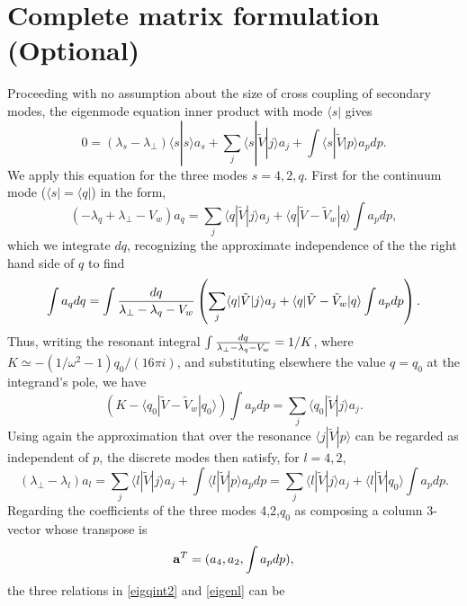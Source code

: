 \documentclass[12pt]{article}
\def\ket#1{|#1\rangle}
\def\bra#1{\langle#1}
\def\a{{\bf a}}
\begin{document}
\section{Complete matrix formulation (Optional)}

Proceeding with no assumption about the size of cross coupling of secondary
modes, the eigenmode equation inner product with mode $\bra{s}|$ gives
\begin{equation}
  \label{eigengen}
  0=(\lambda_s-\lambda_\perp)\bra{s}\ket{s}a_s+\sum_j\bra{s}|\tilde{V}\ket{j}a_j
+\int\bra{s}|\tilde{V}\ket{p}a_pdp.
\end{equation}
We apply this equation for the three modes $s=4,2,q$. First for the
continuum mode ($\bra{s}|=\bra{q}|$) in the form,
\begin{equation}
  \label{eigq}
  (-\lambda_q+\lambda_\perp-V_w)a_q=\sum_j\bra{q}|\tilde{V}\ket{j}a_j
+\bra{q}|\tilde V-\tilde V_w\ket{q}\int a_pdp,
\end{equation}
which we integrate $dq$, recognizing the approximate independence of
the the right hand side of $q$ to find
\begin{equation}
  \label{eigqint}
  \int a_q dq =\int {dq\over \lambda_\perp-\lambda_q-V_w}
  \left(\sum_j\bra{q}|\tilde{V}\ket{j}a_j
+\bra{q}|\tilde V-\tilde V_w\ket{q}\int a_pdp \right).
\end{equation}
Thus, writing the resonant integral
$\int {dq\over \lambda_\perp-\lambda_q-V_w}=1/K$, where
$K\simeq-(1/\omega^2-1)q_0/(16\pi i) $, and substituting elsewhere the
value $q=q_0$ at the integrand's pole, we have
\begin{equation}
  \label{eigqint2}
  (K-\bra{q_0}|\tilde V-\tilde V_w\ket{q_0})\int a_pdp = \sum_j\bra{q_0}|\tilde{V}\ket{j}a_j.
\end{equation}
Using again the approximation that over the resonance
$\bra{j}|\tilde V\ket{p}$ can be regarded as independent of $p$, the
discrete modes then satisfy, for $l=4,2$,
\begin{equation}
  \label{eigenl}
  (\lambda_\perp-\lambda_l)a_l=\sum_j\bra{l}|\tilde{V}\ket{j}a_j
  +\int\bra{l}|\tilde{V}\ket{p}a_pdp
  =\sum_j\bra{l}|\tilde{V}\ket{j}a_j
  +\bra{l}|\tilde{V}\ket{q_0}\int a_pdp.
\end{equation}
Regarding the coefficients of the three modes 4,2,$q_0$ as composing a
column 3-vector whose transpose is
\begin{equation}
  \label{avector}
  \a^T=(a_4,a_2,\int a_pdp),
\end{equation}
the three relations in \ref{eigqint2} and \ref{eigenl} can be
\end{document}
